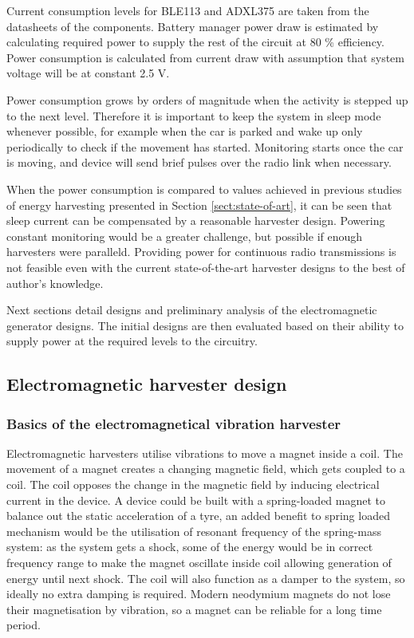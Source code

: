 Current consumption levels for BLE113 and ADXL375 are taken from the datasheets of the components. Battery manager power draw is estimated by calculating required power to supply the rest of the circuit at 80 \% efficiency. Power consumption is calculated from current draw with assumption that system voltage will be at constant 2.5 V.

Power consumption grows by orders of magnitude when the activity is stepped up to the next level. Therefore it is important to keep the system in sleep mode whenever possible, for example when the car is parked and wake up only periodically to check if the movement has started. Monitoring starts once the car is moving, and device will send brief pulses over the radio link when necessary.

When the power consumption is compared to values achieved in previous studies of energy harvesting presented in Section \ref{sect:state-of-art}, it can be seen that sleep current can be compensated by a reasonable harvester design. Powering constant monitoring would be a greater challenge, but possible if enough harvesters were paralleld. Providing power for continuous radio transmissions is not feasible even with the current state-of-the-art harvester designs to the best of author's knowledge. 

Next sections detail designs and preliminary analysis of the electromagnetic generator designs. The initial designs are then evaluated based on their ability to supply power at the required levels to the circuitry.

\subsection{Electromagnetic harvester design}\label{sect:emh_design}
\subsubsection{Basics of the electromagnetical vibration harvester}
Electromagnetic harvesters utilise vibrations to move a magnet inside a coil. The movement of a magnet creates a changing magnetic field, which gets coupled to a coil. The coil opposes the change in the magnetic field by inducing electrical current in the device. A device could be built with a spring-loaded magnet to balance out the static acceleration of a tyre, an added benefit to spring loaded mechanism would be the utilisation of resonant frequency of the spring-mass system: as the system gets a shock, some of the energy would be in correct frequency range to make the magnet oscillate inside coil allowing generation of energy until next shock. The coil will also function as a damper to the system, so ideally no extra damping is required. Modern neodymium magnets do not lose their magnetisation by vibration, so a magnet can be reliable for a long time period. 


